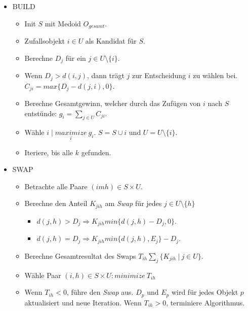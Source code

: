 \documentclass[a4paper,12pt,twoside]{article}
\newcommand{\Fachbegriff}[1]{\textit{#1}}
\begin{document}
\begin{itemize}
\item BUILD
\begin{itemize}
\item Init $S$ mit Medoid $O_{gesamt}$.
\item Zufallsobjekt $i \in U$ als Kandidat für $S$. 
\item Berechne $D_j$ für ein $j \in U \setminus \lbrace i \rbrace$.
\item Wenn $D_j > d(i,j)$, dann trägt $j$ zur Entscheidung $i$ zu wählen bei. $C_{ji} = max \lbrace D_j - d(j,i), 0\rbrace$.
\item Berechne Gesamtgewinn, welcher durch das Zufügen von $i$ nach $S$ entstünde: $g_i = \sum_{j \in U} C_{ji}$.
\item Wähle $i \mid \underset{i}{maximize}~g_i$. $S = S \cup {i}$ und $U = U \setminus \lbrace i \rbrace$.
\item Iteriere, bis alle $k$ gefunden.
\end{itemize}
\end{itemize}

\begin{minipage}{\linewidth}
\begin{itemize}
\item SWAP
\begin{itemize}
\item Betrachte alle Paare $(imh)\in S \times U$.
\item Berechne den Anteil $K_{jih}$ am \Fachbegriff{Swap} für jedes $j \in U \setminus \lbrace h \rbrace$ 
\begin{itemize}
\item $d(j,h) > D_j \Rightarrow K_{jih} min \lbrace d(j,h) - D_j, 0 \rbrace$.
\item $d(j,h) = D_j \Rightarrow K_{jih} min \lbrace d(j,h), E_j \rbrace -D_j$.
\end{itemize}
\item Berechne Gesamtresultat des Swaps $T_{ih} \sum_j \lbrace K_{jih}~|~j \in U \rbrace$.
\item Wähle Paar $(i,h) \in S \times U: minimize~T_{ih}$ 
\item Wenn $T_{ih} < 0$, führe den \Fachbegriff{Swap} aus. $D_p$ und $E_p$ wird für jedes Objekt $p$ aktualisiert und neue Iteration. Wenn $T_{ih} > 0$, terminiere Algorithmus.
\end{itemize}
\end{itemize}
\end{minipage}
\end{document}
